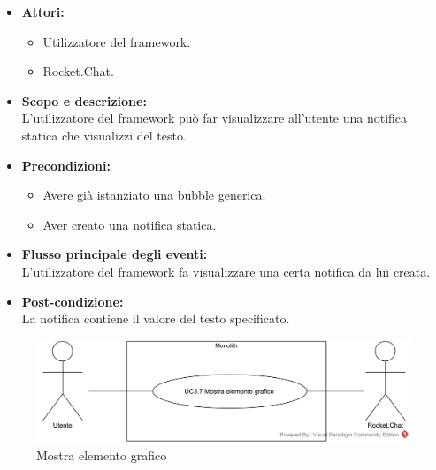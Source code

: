 \begin{itemize}
	\item \textbf{Attori:}
	\begin{itemize}
		\item Utilizzatore del framework.
		\item Rocket.Chat.
	\end{itemize}
	\item \textbf{Scopo e descrizione:} 
	\\L'utilizzatore del framework può far visualizzare all'utente una notifica statica che visualizzi del testo.
	\item \textbf{Precondizioni:}
	\begin{itemize}
		\item Avere già istanziato una bubble generica.
		\item Aver creato una notifica statica.
	\end{itemize}
	\item \textbf{Flusso principale degli eventi:}
	\\L'utilizzatore del framework fa visualizzare una certa notifica da lui creata.
	\item \textbf{Post-condizione:}
	\\La notifica contiene il valore del testo specificato.
\end{itemize}

\begin{samepage}
\nopagebreak
\begin{figure}[H]
	\centering
	\includegraphics[width=15cm]{../../documenti/AnalisiDeiRequisiti/Diagrammi_img/usecase/uc1_21.png}
	\caption{\UCFCaption{} Mostra elemento grafico}
\end{figure}
\end{samepage}

